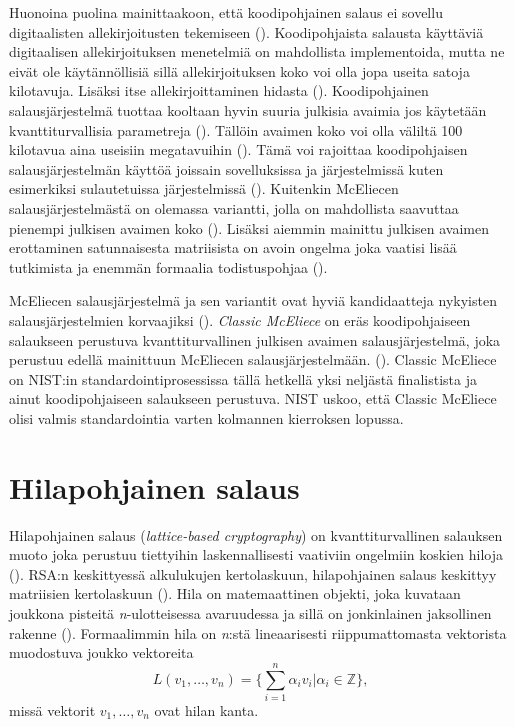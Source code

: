 Huonoina puolina mainittaakoon, että koodipohjainen salaus ei sovellu digitaalisten allekirjoitusten tekemiseen (\cite{8012331}). Koodipohjaista salausta käyttäviä digitaalisen allekirjoituksen menetelmiä on mahdollista implementoida, mutta ne eivät ole käytännöllisiä sillä allekirjoituksen koko voi olla jopa useita satoja kilotavuja. Lisäksi itse allekirjoittaminen hidasta (\cite{buchmann2016post}). Koodipohjainen salausjärjestelmä tuottaa kooltaan hyvin suuria julkisia avaimia jos käytetään kvanttiturvallisia parametreja (\cite{8012331}). Tällöin avaimen koko voi olla väliltä 100 kilotavua aina useisiin megatavuihin (\cite{mavroeidis2018impact}). Tämä voi rajoittaa koodipohjaisen salausjärjestelmän käyttöä joissain sovelluksissa ja järjestelmissä kuten esimerkiksi sulautetuissa järjestelmissä (\cite{repka2014overview}). Kuitenkin McEliecen salausjärjestelmästä on olemassa variantti, jolla on mahdollista saavuttaa pienempi julkisen avaimen koko (\cite{buchmann2016post}). Lisäksi aiemmin mainittu julkisen avaimen erottaminen satunnaisesta matriisista on avoin ongelma joka vaatisi lisää tutkimista ja enemmän formaalia todistuspohjaa (\cite{8012331}).

McEliecen salausjärjestelmä ja sen variantit ovat hyviä kandidaatteja nykyisten salausjärjestelmien korvaajiksi (\cite{8012331}). \emph{Classic McEliece} on eräs koodipohjaiseen salaukseen perustuva kvanttiturvallinen julkisen avaimen salausjärjestelmä, joka perustuu edellä mainittuun McEliecen salausjärjestelmään. (\cite{alagic2020status}). Classic McEliece on NIST:in standardointiprosessissa tällä hetkellä yksi neljästä finalistista ja ainut koodipohjaiseen salaukseen perustuva. NIST uskoo, että Classic McEliece olisi valmis standardointia varten kolmannen kierroksen lopussa.

\section{Hilapohjainen salaus}
Hilapohjainen salaus (\emph{lattice-based cryptography}) on kvanttiturvallinen salauksen muoto joka perustuu tiettyihin laskennallisesti vaativiin ongelmiin koskien hiloja (\cite{regev2006lattice}). RSA:n keskittyessä alkulukujen kertolaskuun, hilapohjainen salaus keskittyy matriisien kertolaskuun (\cite{mavroeidis2018impact}). Hila on matemaattinen objekti, joka kuvataan joukkona pisteitä \emph{n}-ulotteisessa avaruudessa ja sillä on jonkinlainen jaksollinen rakenne (\cite{regev2006lattice}). Formaalimmin hila on \emph{n}:stä lineaarisesti riippumattomasta vektorista muodostuva joukko vektoreita 
\[L(v_1, \ldots ,v_n) =\Bigg\{ {\sum_{i=1}^{n}\alpha_i 
v_i|\alpha_i \in \mathbb{Z}} \Bigg\},\]
missä vektorit $v_1, \ldots ,v_n$ ovat hilan kanta.

